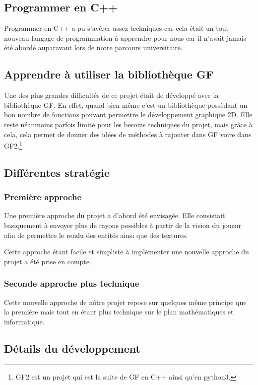 \documentclass[12pt]{report}
\begin{document}
\subsection{Programmer en C++}

Programmer en C++ a pu s'avérer assez techniques car cela était un tout nouveau
langage de programmation à apprendre pour nous car il n'avait jamais été abordé
auparavant lors de notre parcours universitaire.

\subsection{Apprendre à utiliser la bibliothèque GF}

Une des plus grandes difficultés de ce projet était de développé avec la bibliothèque
GF. En effet, quand bien même c'est un bibliothèque possèdant un bon nombre de 
fonctions pouvant permettre le développement graphique 2D. Elle reste néanmoins
parfois limité pour les besoins techniques du projet, mais grâce à cela, cela permet
de donner des idées de méthodes à rajouter dans GF voire dans GF2.\footnote{GF2 est un projet
qui est la suite de GF en C++ ainsi qu'en python3.}


\subsection{Différentes stratégie}
\subsubsection{Première approche}

Une première approche du projet a d'abord été envisagée. Elle consistait 
basiquement à envoyer plus de rayons possibles à partir de la vision du joueur
afin de permettre le rendu des entités ainsi que des textures.

Cette approche étant facile et simpliste à implémenter une nouvelle approche
du projet a été prise en compte.

\subsubsection{Seconde approche plus technique}

Cette nouvelle approche de nôtre projet repose sur quelques même principe que
la première mais tout en étant plus technique sur le plan mathématiques et informatique.

\subsection{Détails du développement}
\end{document}
